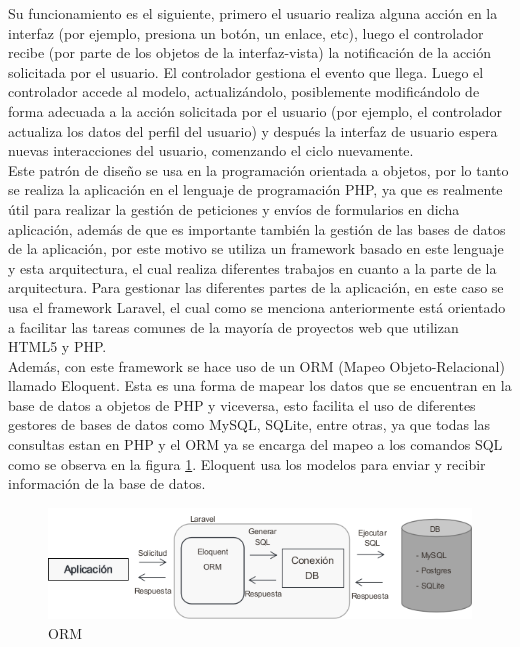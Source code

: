 Su funcionamiento es el siguiente, primero el usuario realiza alguna acción en la interfaz (por ejemplo, presiona un botón, un enlace, etc), luego el controlador recibe (por parte de los objetos de la interfaz-vista) la notificación de la acción solicitada por el usuario. El controlador gestiona el evento que llega. Luego el controlador accede al modelo, actualizándolo, posiblemente modificándolo de forma adecuada a la acción solicitada por el usuario (por ejemplo, el controlador actualiza los datos del perfil del usuario) y después la interfaz de usuario espera nuevas interacciones del usuario, comenzando el ciclo nuevamente.\\

Este patrón de diseño se usa en la programación orientada a objetos, por lo tanto se realiza la aplicación en el lenguaje de programación PHP, ya que es realmente útil para realizar la gestión de peticiones y envíos de formularios en dicha aplicación, además de que es importante también la gestión de las bases de datos de la aplicación, por este motivo se utiliza un framework basado en este lenguaje y esta arquitectura, el cual realiza diferentes trabajos en cuanto a la parte de la arquitectura. Para gestionar las diferentes partes de la aplicación, en este caso se usa el framework Laravel, el cual como se menciona anteriormente está orientado a facilitar las tareas comunes de la mayoría de proyectos web que utilizan HTML5 y PHP.\\

Además, con este framework se hace uso de un ORM (Mapeo Objeto-Relacional) llamado Eloquent. Esta es una forma de mapear los datos que se encuentran en la base de datos a objetos de PHP y viceversa, esto facilita el uso de diferentes gestores de bases de datos como MySQL, SQLite, entre otras, ya que todas las consultas estan en PHP y el ORM ya se encarga del mapeo a los comandos SQL como se observa en la figura \ref{fig:orm}. Eloquent usa los modelos para enviar y recibir información de la base de datos.\\

\begin{figure}[H]
	\centering
	\caption{ORM}
	\label{fig:orm}
	\includegraphics[width=0.7\linewidth]{Imagenes/ORM}
\end{figure}


